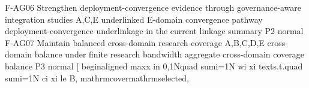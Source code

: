 {}\markdownRendererPipe{} F-AG06 \markdownRendererPipe{} Strengthen deployment-convergence evidence through governance-aware integration studies \markdownRendererPipe{} A,C,E \markdownRendererPipe{} underlinked E-domain convergence pathway \markdownRendererPipe{} deployment-convergence underlinkage in the current linkage summary \markdownRendererPipe{} P2 \markdownRendererPipe{} normal \markdownRendererPipe{}\markdownRendererSoftLineBreak
{}\markdownRendererPipe{} F-AG07 \markdownRendererPipe{} Maintain balanced cross-domain research coverage \markdownRendererPipe{} A,B,C,D,E \markdownRendererPipe{} cross-domain balance under finite research bandwidth \markdownRendererPipe{} aggregate cross-domain coverage balance \markdownRendererPipe{} P3 \markdownRendererPipe{} normal \markdownRendererPipe{}\markdownRendererInterblockSeparator
{}\markdownRendererSectionBegin
{}\markdownRendererInterblockSeparator
{}[\markdownRendererSoftLineBreak
{}\markdownRendererBackslash{}begin\markdownRendererLeftBrace{}aligned\markdownRendererRightBrace{}\markdownRendererSoftLineBreak
{}\markdownRendererBackslash{}max\markdownRendererUnderscore{}\markdownRendererLeftBrace{}x \markdownRendererBackslash{}in \markdownRendererLeftBrace{}0,1\markdownRendererRightBrace{}\markdownRendererCircumflex{}N\markdownRendererRightBrace{}\markdownRendererBackslash{}quad \markdownRendererAmpersand{} \markdownRendererBackslash{}sum\markdownRendererUnderscore{}\markdownRendererLeftBrace{}i=1\markdownRendererRightBrace{}\markdownRendererCircumflex{}\markdownRendererLeftBrace{}N\markdownRendererRightBrace{} w\markdownRendererUnderscore{}i x\markdownRendererUnderscore{}i \markdownRendererBackslash{}\markdownRendererSoftLineBreak
{}\markdownRendererBackslash{}text\markdownRendererLeftBrace{}s.t.\markdownRendererRightBrace{}\markdownRendererBackslash{}quad \markdownRendererAmpersand{} \markdownRendererBackslash{}sum\markdownRendererUnderscore{}\markdownRendererLeftBrace{}i=1\markdownRendererRightBrace{}\markdownRendererCircumflex{}\markdownRendererLeftBrace{}N\markdownRendererRightBrace{} c\markdownRendererUnderscore{}i x\markdownRendererUnderscore{}i \markdownRendererBackslash{}le B,\markdownRendererBackslash{}\markdownRendererSoftLineBreak
{}\markdownRendererAmpersand{} \markdownRendererBackslash{}mathrm\markdownRendererLeftBrace{}cover\markdownRendererRightBrace{}\markdownRendererLeftBrace{}\markdownRendererBackslash{}mathrm\markdownRendererLeftBrace{}selected\markdownRendererRightBrace{}\markdownRendererRightBrace{},\markdownRendererBackslash{}\markdownRendererSoftLineBreak
